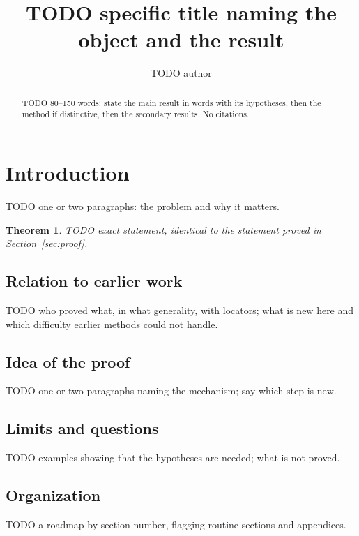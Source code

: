 \documentclass[11pt,reqno]{amsart}
\theoremstyle{plain}
\newtheorem{theorem}{Theorem}[section]
\theoremstyle{definition}
\theoremstyle{remark}
\begin{document}
\title{TODO specific title naming the object and the result}

\author{TODO author}
\address{TODO address}
\date{}

\begin{abstract}
TODO 80--150 words: state the main result in words with its hypotheses,
then the method if distinctive, then the secondary results. No citations.
\end{abstract}

\maketitle

\section{Introduction}

TODO one or two paragraphs: the problem and why it matters.

\begin{theorem}\label{thm:main}
TODO exact statement, identical to the statement proved in
Section~\ref{sec:proof}.
\end{theorem}

\subsection{Relation to earlier work}
TODO who proved what, in what generality, with locators; what is new here
and which difficulty earlier methods could not handle.

\subsection{Idea of the proof}
TODO one or two paragraphs naming the mechanism; say which step is new.

\subsection{Limits and questions}
TODO examples showing that the hypotheses are needed; what is not proved.

\subsection{Organization}
TODO a roadmap by section number, flagging routine sections and appendices.
\end{document}
